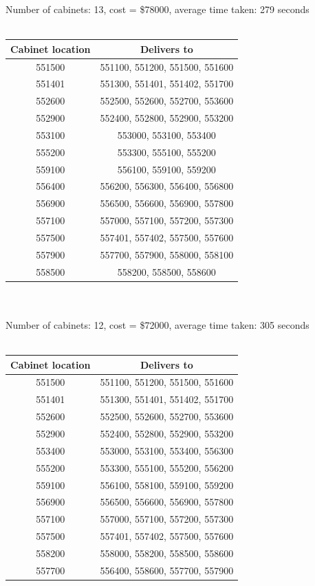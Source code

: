 \documentclass[10pt,a4paper]{article}
\begin{document}
\begin{enumerate}
Number of cabinets: 13, cost = \$78000, average time taken: 279 seconds\\ \\
\begin{tabular}{|c|c|}
	\hline 
	Cabinet location & Delivers to \\ 
	\hline 
	551500 & 551100, 551200, 551500, 551600 \\ 
	\hline 
	551401 & 551300, 551401, 551402, 551700 \\ 
	\hline 
	552600 & 552500, 552600, 552700, 553600 \\ 
	\hline 
	552900 & 552400, 552800, 552900, 553200 \\ 
	\hline 
	553100 & 553000, 553100, 553400 \\ 
	\hline 
	555200 & 553300, 555100, 555200 \\ 
	\hline 
	559100 & 556100, 559100, 559200 \\ 
	\hline 
	556400 & 556200, 556300, 556400, 556800 \\ 
	\hline 
	556900 & 556500, 556600, 556900, 557800 \\ 
	\hline 
	557100 & 557000, 557100, 557200, 557300 \\ 
	\hline 
	557500 & 557401, 557402, 557500, 557600 \\ 
	\hline 
	557900 & 557700, 557900, 558000, 558100 \\ 
	\hline 
	558500 & 558200, 558500, 558600 \\ 
	\hline 
\end{tabular} \\ \\

Number of cabinets: 12, cost = \$72000, average time taken: 305 seconds\\ \\
\begin{tabular}{|c|c|}
	\hline 
	Cabinet location & Delivers to \\ 
	\hline 
	551500 & 551100, 551200, 551500, 551600 \\ 
	\hline 
	551401 & 551300, 551401, 551402, 551700 \\ 
	\hline 
	552600 & 552500, 552600, 552700, 553600 \\ 
	\hline 
	552900 & 552400, 552800, 552900, 553200 \\ 
	\hline 
	553400 & 553000, 553100, 553400, 556300 \\ 
	\hline 
	555200 & 553300, 555100, 555200, 556200 \\ 
	\hline 
	559100 & 556100, 558100, 559100, 559200 \\ 
	\hline 
	556900 & 556500, 556600, 556900, 557800 \\ 
	\hline 
	557100 & 557000, 557100, 557200, 557300 \\ 
	\hline 
	557500 & 557401, 557402, 557500, 557600 \\ 
	\hline 
	558200 & 558000, 558200, 558500, 558600 \\ 
	\hline 
	557700 & 556400, 558600, 557700, 557900 \\ 
	\hline 
\end{tabular} \\ \\


\end{enumerate}
\end{document}
